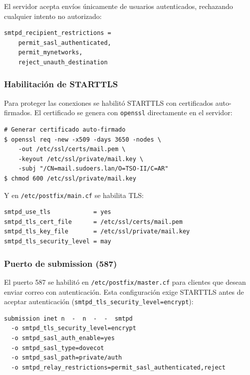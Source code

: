El servidor acepta envíos únicamente de usuarios autenticados, rechazando
cualquier intento no autorizado:

\begin{lstlisting}[style=terminal]
smtpd_recipient_restrictions =
    permit_sasl_authenticated,
    permit_mynetworks,
    reject_unauth_destination
\end{lstlisting}

\subsubsection{Habilitación de STARTTLS}

Para proteger las conexiones se habilitó STARTTLS con certificados
auto-firmados. El certificado se genera con \texttt{openssl} directamente
en el servidor:

\begin{lstlisting}[style=terminal]
# Generar certificado auto-firmado
$ openssl req -new -x509 -days 3650 -nodes \
    -out /etc/ssl/certs/mail.pem \
    -keyout /etc/ssl/private/mail.key \
    -subj "/CN=mail.sudoers.lan/O=TSO-II/C=AR"
$ chmod 600 /etc/ssl/private/mail.key
\end{lstlisting}

Y en \texttt{/etc/postfix/main.cf} se habilita TLS:

\begin{lstlisting}[style=terminal]
smtpd_use_tls            = yes
smtpd_tls_cert_file      = /etc/ssl/certs/mail.pem
smtpd_tls_key_file       = /etc/ssl/private/mail.key
smtpd_tls_security_level = may
\end{lstlisting}

\subsubsection{Puerto de submission (587)}

El puerto 587 se habilitó en \texttt{/etc/postfix/master.cf} para clientes
que desean enviar correo con autenticación. Esta configuración exige STARTTLS
antes de aceptar autenticación (\texttt{smtpd\_tls\_security\_level=encrypt}):

\begin{lstlisting}[style=terminal]
submission inet n  -  n  -  -  smtpd
  -o smtpd_tls_security_level=encrypt
  -o smtpd_sasl_auth_enable=yes
  -o smtpd_sasl_type=dovecot
  -o smtpd_sasl_path=private/auth
  -o smtpd_relay_restrictions=permit_sasl_authenticated,reject
\end{lstlisting}

